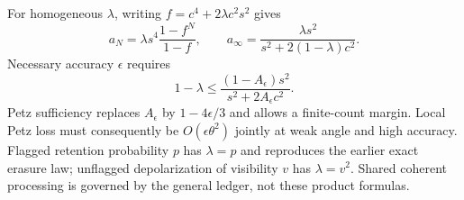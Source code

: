 For homogeneous $\lambda$, writing $f=c^4+2\lambda c^2s^2$ gives
\[
 a_N=\lambda s^4\frac{1-f^N}{1-f},\qquad
 a_\infty=\frac{\lambda s^2}{s^2+2(1-\lambda)c^2}.
\]
Necessary accuracy $\epsilon$ requires
\[
 1-\lambda\le\frac{(1-A_\epsilon)s^2}{s^2+2A_\epsilon c^2}.
\]
Petz sufficiency replaces $A_\epsilon$ by $1-4\epsilon/3$ and allows a
finite-count margin. Local Petz loss must consequently be
$O(\epsilon\theta^2)$ jointly at weak angle and high accuracy. Flagged
retention probability $p$ has $\lambda=p$ and reproduces the earlier exact
erasure law; unflagged depolarization of visibility $v$ has $\lambda=v^2$.
Shared coherent processing is governed by the general ledger, not these
product formulas.

